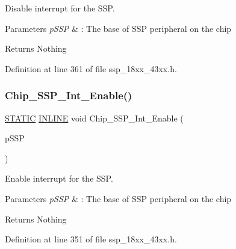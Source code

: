 Disable interrupt for the S\+SP. 


\begin{DoxyParams}{Parameters}
{\em p\+S\+SP} & \+: The base of S\+SP peripheral on the chip \\
\hline
\end{DoxyParams}
\begin{DoxyReturn}{Returns}
Nothing 
\end{DoxyReturn}


Definition at line 361 of file ssp\+\_\+18xx\+\_\+43xx.\+h.

\mbox{\label{group___s_s_p__18_x_x__43_x_x_ga98eb3a788e313aeb5a4feb2516b11e8f}} 
\subsubsection{\texorpdfstring{Chip\+\_\+\+S\+S\+P\+\_\+\+Int\+\_\+\+Enable()}{Chip\_SSP\_Int\_Enable()}}
{\footnotesize\ttfamily \hyperlink{group___l_p_c___types___public___macros_ga10b2d890d871e1489bb02b7e70d9bdfb}{S\+T\+A\+T\+IC} \hyperlink{spifi__18xx__43xx_8h_a2eb6f9e0395b47b8d5e3eeae4fe0c116}{I\+N\+L\+I\+NE} void Chip\+\_\+\+S\+S\+P\+\_\+\+Int\+\_\+\+Enable (\begin{DoxyParamCaption}\item[{\hyperlink{struct_l_p_c___s_s_p___t}{L\+P\+C\+\_\+\+S\+S\+P\+\_\+T} $\ast$}]{p\+S\+SP }\end{DoxyParamCaption})}



Enable interrupt for the S\+SP. 


\begin{DoxyParams}{Parameters}
{\em p\+S\+SP} & \+: The base of S\+SP peripheral on the chip \\
\hline
\end{DoxyParams}
\begin{DoxyReturn}{Returns}
Nothing 
\end{DoxyReturn}


Definition at line 351 of file ssp\+\_\+18xx\+\_\+43xx.\+h.

